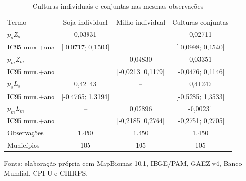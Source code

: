 \begin{table}[htbp]
\centering
\footnotesize
\setlength{\tabcolsep}{3pt}
\renewcommand{\arraystretch}{1.1}
\normalcaption\captionstyle{\centering}
\caption{Culturas individuais e conjuntas nas mesmas observações}
\label{tab:h1-conjunto-etapa9}
\begin{tabular}{lccc}
\hline
Termo & Soja individual & Milho individual & Culturas conjuntas \\
$p_sZ_s$ & 0,03931 & -- & 0,02711 \\
IC95 mun.+ano & [-0,0717; 0,1503] &  & [-0,0998; 0,1540] \\
$p_mZ_m$ & -- & 0,04830 & 0,03351 \\
IC95 mun.+ano &  & [-0,0213; 0,1179] & [-0,0476; 0,1146] \\
$p_sL_s$ & 0,42143 & -- & 0,41242 \\
IC95 mun.+ano & [-0,4765; 1,3194] &  & [-0,5285; 1,3533] \\
$p_mL_m$ & -- & 0,02896 & -0,00231 \\
IC95 mun.+ano &  & [-0,2185; 0,2764] & [-0,2751; 0,2705] \\
Observações & 1.450 & 1.450 & 1.450 \\
Municípios & 105 & 105 & 105 \\
\hline\end{tabular}
\par\smallskip
\begin{minipage}{\textwidth}\footnotesize\centering
Fonte: elaboração própria com MapBiomas 10.1, IBGE/PAM, GAEZ v4, Banco Mundial, CPI-U e CHIRPS.
\end{minipage}
\end{table}
